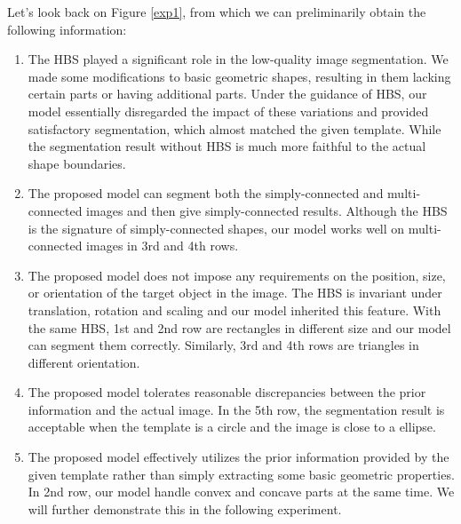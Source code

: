 \documentclass[review,onefignum,onetabnum]{siamonline190516}
\begin{document}
Let's look back on Figure \ref{exp1}, from which we can preliminarily obtain the following information:
\begin{enumerate}
    \item The HBS played a significant role in the low-quality image segmentation. We made some modifications to basic geometric shapes, resulting in them lacking certain parts or having additional parts. Under the guidance of HBS, our model essentially disregarded the impact of these variations and provided satisfactory segmentation, which almost matched the given template. While the segmentation result without HBS is much more faithful to the actual shape boundaries.
    \item The proposed model can segment both the simply-connected and multi-connected images and then give simply-connected results. Although the HBS is the signature of simply-connected shapes, our model works well on multi-connected images in 3rd and 4th rows.
    \item The proposed model does not impose any requirements on the position, size, or orientation of the target object in the image. The HBS is invariant under translation, rotation and scaling and our model inherited this feature. With the same HBS, 1st and 2nd row are rectangles in different size and our model can segment them correctly. Similarly, 3rd and 4th rows are triangles in different orientation.
    \item The proposed model tolerates reasonable discrepancies between the prior information and the actual image. In the 5th row, the segmentation result is acceptable when the template is a circle and the image is close to a ellipse.
    \item The proposed model effectively utilizes the prior information provided by the given template rather than simply extracting some basic geometric properties. In 2nd row, our model handle convex and concave parts at the same time. We will further demonstrate this in the following experiment.
\end{enumerate}
\end{document}

